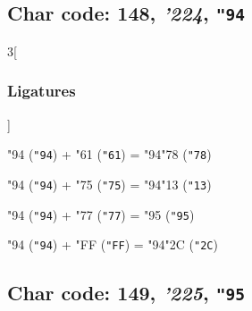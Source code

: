 \documentclass{article}
\newlength{\maxcharwidth}
\begin{document}
\subsection{Char code: 148, {\it'224}, {\tt"94}}
\label{char_148}


\begin{multicols}{3}[\subsubsection{Ligatures}]

{\testfont\char"94\noboundary} ({\tt"94}) + {\testfont\char"61\noboundary} ({\tt"61}) = {\testfont\char"94\noboundary}{\testfont\char"78\noboundary} ({\tt"78}) 

{\testfont\char"94\noboundary} ({\tt"94}) + {\testfont\char"75\noboundary} ({\tt"75}) = {\testfont\char"94\noboundary}{\testfont\char"13\noboundary} ({\tt"13}) 

{\testfont\char"94\noboundary} ({\tt"94}) + {\testfont\char"77\noboundary} ({\tt"77}) = {\testfont\char"95\noboundary} ({\tt"95}) 

{\testfont\char"94\noboundary} ({\tt"94}) + {\testfont\char"FF\noboundary} ({\tt"FF}) = {\testfont\char"94\noboundary}{\testfont\char"2C\noboundary} ({\tt"2C}) 

\end{multicols}

\subsection{Char code: 149, {\it'225}, {\tt"95}}
\label{char_149}

\end{document}
